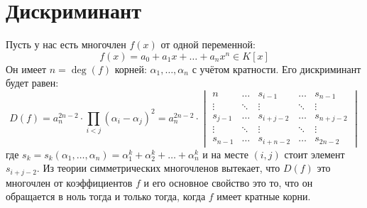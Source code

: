 \documentclass[12pt]{article}
\newcommand{\RN}[1]{%
	\textup{\uppercase\expandafter{\romannumeral#1}}%
}
\theoremstyle{definition}
\begin{document}
\lhead{Алгебра-\RN{1}}
\section*{Дискриминант}
Пусть у нас есть многочлен $f(x)$ от одной переменной: 
$$
	f(x) = a_0 + a_1x + \dotsc + a_nx^n \in K[x]
$$ 
Он имеет $n = \deg(f)$ корней: $\alpha_1,\dotsc,\alpha_n$ с учётом кратности. Его дискриминант будет равен:
$$
	D(f) = a_n^{2n-2}{\cdot}\prod\limits_{i< j}(\alpha_i - \alpha_j)^2 = a_n^{2n-2}{\cdot}
	\begin{vmatrix}
		n &  \dotsc & s_{i-1} & \dotsc  & s_{n-1} \\
		\vdots &  \ddots & \vdots & \ddots & \vdots\\
		s_{j-1} &  \dotsc & s_{i+j - 2} & \dotsc & s_{n+j - 2}\\
		\vdots &  \ddots & \vdots & \ddots & \vdots\\
		s_{n-1} &  \dotsc & s_{i+n - 2} & \dotsc & s_{2n - 2}
	\end{vmatrix}
$$
где $s_k= s_k(\alpha_1,\dotsc,\alpha_n) = \alpha_1^k + \alpha_2^k + \dotsc + \alpha_n^k$ и на месте $(i,j)$ стоит элемент $s_{i + j - 2}$. Из теории симметрических многочленов вытекает, что $D(f)$ это многочлен от коэффициентов $f$ и его основное свойство это то, что он обращается в ноль тогда и только тогда, когда $f$ имеет кратные корни.
\end{document}

